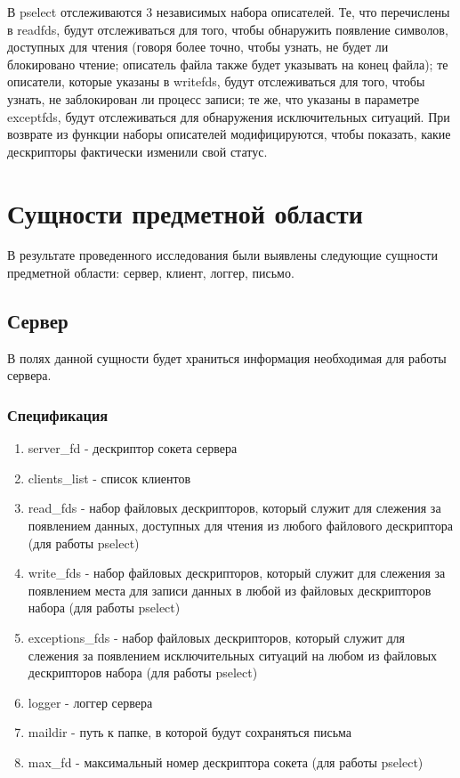 \documentclass[a4paper,12pt]{report}
\begin{document}
В pselect отслеживаются 3 независимых набора описателей. Те, что перечислены в readfds, будут отслеживаться для того, чтобы обнаружить появление символов, доступных для чтения (говоря более точно, чтобы узнать, не будет ли блокировано чтение; описатель файла также будет указывать на конец файла); те описатели, которые указаны в writefds, будут отслеживаться для того, чтобы узнать, не заблокирован ли процесс записи; те же, что указаны в параметре exceptfds, будут отслеживаться для обнаружения исключительных ситуаций. При возврате из функции наборы описателей модифицируются, чтобы показать, какие дескрипторы фактически изменили свой статус.


\section{Сущности предметной области}
В результате проведенного исследования были выявлены следующие сущности предметной области: сервер, клиент, логгер, письмо.

\subsection{Сервер}

В полях данной сущности будет храниться информация необходимая для работы сервера.

\subsubsection{Спецификация}

\begin{enumerate}
	\item server\_fd - дескриптор сокета сервера
	\item clients\_list - список клиентов
	\item read\_fds - набор файловых дескрипторов, который служит для слежения за появлением данных, доступных для чтения из любого файлового дескриптора (для работы pselect)
	\item write\_fds - набор файловых дескрипторов, который служит для слежения за появлением места для записи данных в любой из файловых дескрипторов набора (для работы pselect)
	\item exceptions\_fds - набор файловых дескрипторов, который служит для слежения за появлением исключительных ситуаций на любом из файловых дескрипторов набора (для работы pselect)
	\item logger - логгер сервера
	\item maildir - путь к папке, в которой будут сохраняться письма
	\item max\_fd - максимальный номер дескриптора сокета (для работы pselect)
\end{enumerate}
\end{document}
